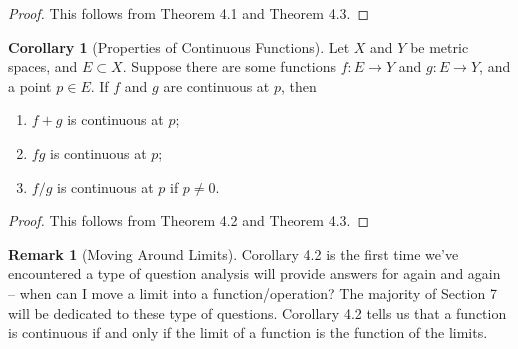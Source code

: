 \documentclass{article}
\theoremstyle{definition}
\newtheorem{corollary}{Corollary}[section]
\newtheorem{remark}{Remark}[section]
\begin{document}
	\begin{proof}
		This follows from Theorem 4.1 and Theorem 4.3. 
	\end{proof}
	\begin{corollary}[Properties of Continuous Functions] 
		Let $ X $ and $ Y $ be metric spaces, and $ E\subset X $. Suppose there are some functions $ f:E\to Y $ and $ g:E\to Y $, and a point $ p \in E $. If $ f $ and $ g $ are continuous at $ p $, then 
		\begin{enumerate}
			\item $ f+g $ is continuous at $ p $;
			\item $ fg $ is continuous at $ p $;
			\item $ f/g $ is continuous at $ p $ if $ p\neq0 $.
		\end{enumerate}
	\end{corollary}
	\begin{proof}
		This follows from Theorem 4.2 and Theorem 4.3.
	\end{proof}
	\begin{remark}[Moving Around Limits]
		Corollary 4.2 is the first time we've encountered a type of question analysis will provide answers for again and again -- when can I move a limit into a function/operation? The majority of Section 7 will be dedicated to these type of questions. Corollary 4.2 tells us that a function is continuous if and only if the limit of a function is the function of the limits.   
	\end{remark}
\end{document}
